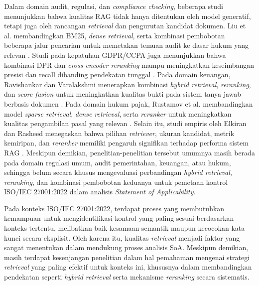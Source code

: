 Dalam domain audit, regulasi, dan \textit{compliance checking}, beberapa studi menunjukkan bahwa kualitas RAG tidak hanya ditentukan oleh model generatif, tetapi juga oleh rancangan \textit{retrieval} dan pengurutan kandidat dokumen. Liu et al. membandingkan BM25, \textit{dense retrieval}, serta kombinasi pembobotan beberapa jalur pencarian untuk memetakan temuan audit ke dasar hukum yang relevan \cite{lajbr2025}. Studi pada kepatuhan GDPR/CCPA juga menunjukkan bahwa kombinasi DPR dan \textit{cross-encoder reranking} mampu meningkatkan keseimbangan presisi dan recall dibanding pendekatan tunggal \cite{gupta2025compliance}. Pada domain keuangan, Ravishankar dan Varalakshmi menerapkan kombinasi \textit{hybrid retrieval}, \textit{reranking}, dan \textit{score fusion} untuk meningkatkan kualitas bukti pada sistem tanya jawab berbasis dokumen \cite{ravishankar2025hybrid}. Pada domain hukum pajak, Rustamov et al. membandingkan model \textit{sparse retrieval}, \textit{dense retrieval}, serta \textit{reranker} untuk meningkatkan kualitas pengambilan pasal yang relevan \cite{rustamov2025tax}. Selain itu, studi empiris oleh Elkiran dan Rasheed menegaskan bahwa pilihan \textit{retriever}, ukuran kandidat, metrik kemiripan, dan \textit{reranker} memiliki pengaruh signifikan terhadap performa sistem RAG \cite{elkiran2026empirical}. Meskipun demikian, penelitian-penelitian tersebut umumnya masih berada pada domain regulasi umum, audit pemerintahan, keuangan, atau hukum, sehingga belum secara khusus mengevaluasi perbandingan \textit{hybrid retrieval}, \textit{reranking}, dan kombinasi pembobotan keduanya untuk pemetaan kontrol ISO/IEC 27001:2022 dalam analisis \textit{Statement of Applicability}.

Pada konteks ISO/IEC 27001:2022, terdapat proses yang membutuhkan kemampuan untuk mengidentifikasi kontrol yang paling sesuai berdasarkan konteks tertentu, melibatkan baik kesamaan semantik maupun kecocokan kata kunci secara eksplisit. Oleh karena itu, kualitas \textit{retrieval} menjadi faktor yang sangat menentukan dalam mendukung proses analisis SoA. Meskipun demikian, masih terdapat kesenjangan penelitian dalam hal pemahaman mengenai strategi \textit{retrieval} yang paling efektif untuk konteks ini, khususnya dalam membandingkan pendekatan seperti \textit{hybrid retrieval} serta mekanisme \textit{reranking} secara sistematis.

